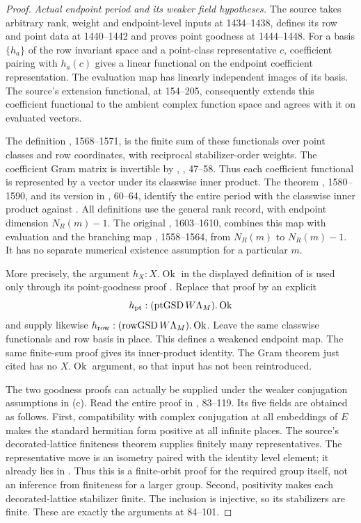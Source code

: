 \begin{proof}
\textit{Actual endpoint period and its weaker field hypotheses.}
The source  takes arbitrary
rank, weight and endpoint-level inputs at 1434--1438, defines its row and
point data at 1440--1442 and proves point goodness at 1444--1448.
For a basis $\{h_a\}$ of the row invariant space and a point-class
representative $c$, coefficient pairing with $h_a(c)$ gives a linear
functional on the endpoint coefficient representation.
The evaluation map has linearly independent images of its basis.
The source's extension functional, at 154--205, consequently extends
this coefficient functional to the ambient complex function space and
agrees with it on evaluated vectors.

The definition , 1568--1571, is the finite sum of these
functionals over point classes and row coordinates, with reciprocal
stabilizer-order weights.
The coefficient Gram matrix is invertible by
, , 47--58.
Thus each coefficient functional is represented by a vector under its
classwise inner product. The theorem
, 1580--1590, and its version in
, 60--64, identify the entire period with the
classwise inner product against .
All definitions use the general rank record, with endpoint dimension
$N_R(m)-1$.
The original , 1603--1610, combines this map with evaluation
and the branching map , 1558--1564, from $N_R(m)$ to $N_R(m)-1$.
It has no separate numerical existence assumption for a particular $m$.

More precisely, the argument $h_X:X.\operatorname{Ok}$ in the displayed
definition of  is used only through its point-goodness
proof .
Replace that proof by an explicit
\[
 h_{\rm pt}:(\operatorname{ptGSD}W\Lambda_M).\operatorname{Ok}
\]
and supply likewise
$h_{\rm row}:(\operatorname{rowGSD}W\Lambda_M).\operatorname{Ok}$.
Leave the same classwise functionals and row basis in place.
This defines a weakened endpoint map.
The same finite-sum proof gives its inner-product identity.
The Gram theorem just cited has no $X.\operatorname{Ok}$ argument,
so that input has not been reintroduced.

The two goodness proofs can actually be supplied under the weaker
conjugation assumptions in (c).
Read the entire proof  in
, 83--119.
Its five  fields are obtained as follows.
First, compatibility with complex conjugation at all embeddings of $E$
makes the standard hermitian form positive at all infinite places.
The source's decorated-lattice finiteness theorem supplies finitely many
representatives. The representative move is an isometry paired with the
identity level element; it already lies in .
Thus this is a finite-orbit proof for the required group itself, not an
inference from finiteness for a larger group.
Second, positivity makes each decorated-lattice stabilizer finite.
The inclusion  is injective, so its stabilizers are finite.
These are exactly the arguments at 84--101.


\end{proof}
